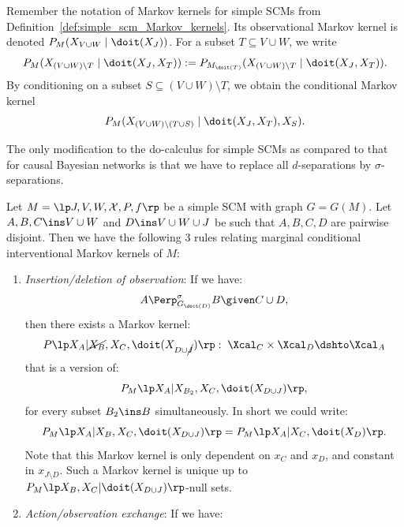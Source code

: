 Remember the notation of Markov kernels for simple SCMs from Definition~\ref{def:simple_scm_Markov_kernels}.
Its observational Markov kernel is denoted $P_{M}(X_{V\cup W} \mid \doit(X_J))$.
For a subset $T \subseteq V \cup W$, we write 
$$P_{M}(X_{(V\cup W)\setminus T} \mid \doit(X_J,X_T)) := P_{M_{\doit(T)}}(X_{(V\cup W)\setminus T} \mid \doit(X_J,X_T)).$$
By conditioning on a subset $S \subseteq (V \cup W) \setminus T$, we obtain the conditional Markov kernel
$$P_{M}(X_{(V\cup W)\setminus (T \cup S)} \mid \doit(X_J,X_T), X_S).$$

The only modification to the do-calculus for simple SCMs as compared to that for causal Bayesian networks is that
we have to replace all $d$-separations by $\sigma$-separations.
\begin{Cor}\label{cor:scm_do_calculus}
  Let $M = \lt \Sin, \Send, \Srnd, \CX, P, f \rt$ be a simple SCM with graph $G = G(M)$.
  Let $A,B,C \ins V \cup W$ and $D \ins V \cup W \cup J$ be such that $A,B,C,D$ are pairwise disjoint.
  Then we have the following 3 rules relating marginal conditional interventional Markov kernels of $M$:
    \begin{enumerate}
        \item \emph{Insertion/deletion of observation}: If we have:
            \[ A \Perp^\sigma_{G_{\doit(D)}} B \given C \cup D,   \]
            then there exists a Markov kernel:
            \[ P\lp X_A|\cancel{X_B},X_C,\doit(X_{D\cup \cancel{J}})\rp:\;  \Xcal_C \times \Xcal_{D} \dshto \Xcal_A \]
            that is a version of:
            \[P_{M}\lp X_A|X_{B_2},X_C,\doit(X_{D\cup J})\rp,\] 
            for every subset $B_2 \ins B$ simultaneously.
            In short we could write:
            \[ P_{M}\lp X_A|X_B,X_C,\doit(X_{D\cup J})\rp = P_{M}\lp X_A|X_C,\doit(X_D)\rp.\]
            Note that this Markov kernel is only dependent on $x_C$ and $x_{D}$, and constant in $x_{J\setminus D}$.
            Such a Markov kernel is unique up to $P_{M}\lp X_B,X_C|\doit(X_{D\cup J})\rp$-null sets.
         \item \emph{Action/observation exchange}: If we have:

\end{enumerate}
\end{Cor}
